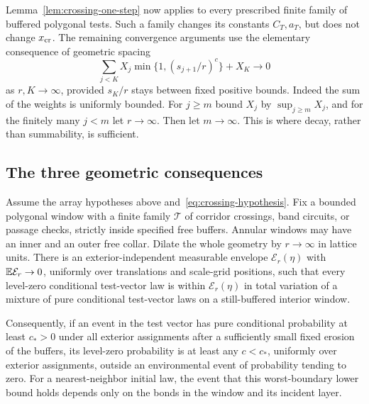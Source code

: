 Lemma~\ref{lem:crossing-one-step} now applies to every prescribed finite
family of buffered polygonal tests.  Such a family changes its constants
$C_T,a_T$, but does not change $x_{\rm cr}$.  The remaining convergence
arguments use the elementary consequence of geometric spacing
\begin{equation}
 \sum_{j<K}X_j\min\{1,(s_{j+1}/r)^c\}+X_K\longrightarrow0
 \label{eq:crossing-weighted-decay}
\end{equation}
as $r,K\to\infty$, provided $s_K/r$ stays between fixed positive bounds.
Indeed the sum of the weights is uniformly bounded.  For $j\geq m$
bound $X_j$ by $\sup_{j\geq m}X_j$, and for the finitely many $j<m$
let $r\to\infty$.  Then let $m\to\infty$.  This is where decay, rather
than summability, is sufficient.

\subsection{The three geometric consequences}

\begin{proposition}
\label{prop:local-comparison}
Assume the array hypotheses above and~\eqref{eq:crossing-hypothesis}.
Fix a bounded polygonal window with a finite family $\mathcal T$ of
corridor crossings, band circuits, or passage checks, strictly inside
specified free buffers.  Annular windows may have an inner and an outer
free collar.  Dilate the whole geometry by $r\to\infty$ in lattice units.
There is an exterior-independent measurable envelope $\mathcal E_r(\eta)$
with $\mathbb E\mathcal E_r\to0$, uniformly over translations and scale-grid
positions, such that every level-zero conditional test-vector law is
within $\mathcal E_r(\eta)$ in total variation of a mixture of pure
conditional test-vector laws on a still-buffered interior window.

Consequently, if an event in the test vector has pure conditional
probability at least $c_*>0$ under all exterior assignments after a
sufficiently small fixed erosion of the buffers, its level-zero
probability is at least any $c<c_*$, uniformly over exterior assignments,
outside an environmental event of probability tending to zero.  For a
nearest-neighbor initial law, the event that this worst-boundary lower
bound holds depends only on the bonds in the window and its incident
layer.
\end{proposition}

